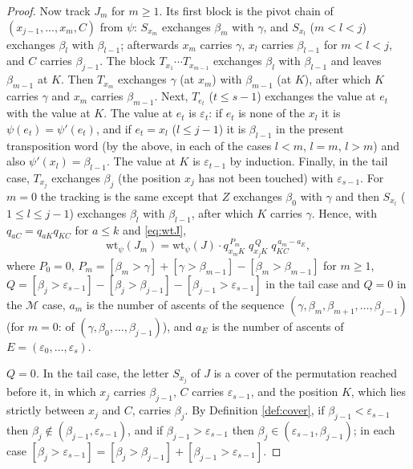 \documentclass{amsart}
\theoremstyle{definition}
\theoremstyle{remark}
\numberwithin{equation}{section}
\begin{document}
\begin{proof}
Now track $J_m$ for $m\geq1$. Its first block is the pivot chain of $(x_{j-1},\ldots,x_m,C)$ from $\psi$: $S_{x_m}$ exchanges $\beta_m$ with $\gamma$, and $S_{x_l}$ ($m<l<j$) exchanges $\beta_l$ with $\beta_{l-1}$; afterwards $x_m$ carries $\gamma$, $x_l$ carries $\beta_{l-1}$ for $m<l<j$, and $C$ carries $\beta_{j-1}$. The block $T_{x_1}\cdots T_{x_{m-1}}$ exchanges $\beta_l$ with $\beta_{l-1}$ and leaves $\beta_{m-1}$ at $K$. Then $T_{x_m}$ exchanges $\gamma$ (at $x_m$) with $\beta_{m-1}$ (at $K$), after which $K$ carries $\gamma$ and $x_m$ carries $\beta_{m-1}$. Next, $T_{e_t}$ ($t\leq s-1$) exchanges the value at $e_t$ with the value at $K$. The value at $e_t$ is $\varepsilon_t$: if $e_t$ is none of the $x_l$ it is $\psi(e_t)=\psi'(e_t)$, and if $e_t=x_l$ ($l\leq j-1$) it is $\beta_{l-1}$ in the present transposition word (by the above, in each of the cases $l<m$, $l=m$, $l>m$) and also $\psi'(x_l)=\beta_{l-1}$. The value at $K$ is $\varepsilon_{t-1}$ by induction. Finally, in the tail case, $T_{x_j}$ exchanges $\beta_j$ (the position $x_j$ has not been touched) with $\varepsilon_{s-1}$. For $m=0$ the tracking is the same except that $Z$ exchanges $\beta_0$ with $\gamma$ and then $S_{x_l}$ ($1\leq l\leq j-1$) exchanges $\beta_l$ with $\beta_{l-1}$, after which $K$ carries $\gamma$. Hence, with $q_{aC}=q_{aK}q_{KC}$ for $a\leq k$ and \eqref{eq:wtJ},
\begin{equation}\label{eq:wtJm}
\mathrm{wt}_\psi(J_m)=\mathrm{wt}_\psi(J)\cdot q_{x_mK}^{\,P_m}\;q_{x_jK}^{\,Q}\;q_{KC}^{\,a_m-a_E},
\end{equation}
where $P_0=0$, $P_m=[\beta_m>\gamma]+[\gamma>\beta_{m-1}]-[\beta_m>\beta_{m-1}]$ for $m\geq1$, $Q=[\beta_j>\varepsilon_{s-1}]-[\beta_j>\beta_{j-1}]-[\beta_{j-1}>\varepsilon_{s-1}]$ in the tail case and $Q=0$ in the $\mathcal M$ case, $a_m$ is the number of ascents of the sequence $(\gamma,\beta_m,\beta_{m+1},\ldots,\beta_{j-1})$ (for $m=0$: of $(\gamma,\beta_0,\ldots,\beta_{j-1})$), and $a_E$ is the number of ascents of $E=(\varepsilon_0,\ldots,\varepsilon_s)$.

\emph{$Q=0$.} In the tail case, the letter $S_{x_j}$ of $J$ is a cover of the permutation reached before it, in which $x_j$ carries $\beta_{j-1}$, $C$ carries $\varepsilon_{s-1}$, and the position $K$, which lies strictly between $x_j$ and $C$, carries $\beta_j$. By Definition \ref{def:cover}, if $\beta_{j-1}<\varepsilon_{s-1}$ then $\beta_j\notin(\beta_{j-1},\varepsilon_{s-1})$, and if $\beta_{j-1}>\varepsilon_{s-1}$ then $\beta_j\in(\varepsilon_{s-1},\beta_{j-1})$; in each case $[\beta_j>\varepsilon_{s-1}]=[\beta_j>\beta_{j-1}]+[\beta_{j-1}>\varepsilon_{s-1}]$.


\end{proof}
\end{document}
